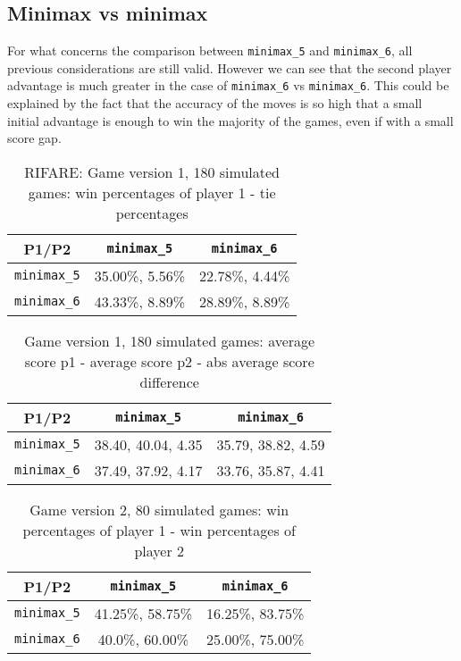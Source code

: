 \documentclass[conference]{IEEEtran}
\begin{document}
\subsection{Minimax vs minimax}

For what concerns the comparison between \verb|minimax_5| and \verb|minimax_6|, all previous considerations are still valid. However we can see that the second player advantage is much greater in the case of \verb|minimax_6| vs \verb|minimax_6|. This could be explained by the fact that the accuracy of the moves is so high that a small initial advantage is enough to win the majority of the games, even if with a small score gap.

\begin{table}[hbt!]
\begin{center}
\begin{tabular}{|c||c|c|}
    \hline
    P1/P2 &  \verb|minimax_5| & \verb|minimax_6|\\
    \hline \hline
    \verb|minimax_5| & 35.00\%, 5.56\% & 22.78\%, 4.44\%\\
    \hline
    \verb|minimax_6| & 43.33\%, 8.89\% & 28.89\%, 8.89\%\\
    \hline
\end{tabular}
\caption{RIFARE: Game version 1, 180 simulated games: win percentages of player 1 - tie percentages}
\end{center}
\end{table}

\begin{table}[hbt!]
\begin{center}
\begin{tabular}{|c||c|c|}
    \hline
    P1/P2 &  \verb|minimax_5| &  \verb|minimax_6|\\
    \hline \hline
     \verb|minimax_5| & 38.40, 40.04, 4.35 & 35.79, 38.82, 4.59\\
    \hline
     \verb|minimax_6| & 37.49, 37.92, 4.17 & 33.76, 35.87, 4.41\\
    \hline
\end{tabular}
\caption{Game version 1, 180 simulated games: average score p1 - average score p2 - abs average score difference}
\end{center}
\end{table}

\begin{table}[hbt!]
\begin{center}
\begin{tabular}{|c||c|c|}
    \hline
    P1/P2 &  \verb|minimax_5| & \verb|minimax_6|\\
    \hline \hline
    \verb|minimax_5| & 41.25\%, 58.75\% & 16.25\%, 83.75\%\\
    \hline
    \verb|minimax_6| & 40.0\%, 60.00\% & 25.00\%, 75.00\%\\
    \hline
\end{tabular}
\caption{Game version 2, 80 simulated games: win percentages of player 1 - win percentages of player 2}
\end{center}
\end{table}
\end{document}
